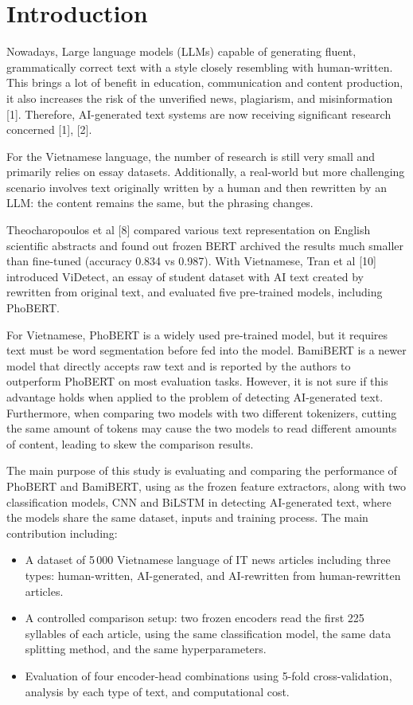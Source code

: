 \documentclass[conference,a4paper]{IEEEtran}
\begin{document}
\section{Introduction}
\label{sec:intro}
Nowadays, Large language models (LLMs) capable of generating fluent, grammatically correct text with a style closely resembling with human-written. This brings a lot of benefit in education, communication and content production, it also increases the risk of the unverified news, plagiarism, and misinformation [1]. Therefore, AI-generated text systems are now receiving significant research concerned [1], [2].

For the Vietnamese language, the number of research is still very small and primarily relies on essay datasets. Additionally, a real-world but more challenging scenario involves text originally written by a human and then rewritten by an LLM: the content remains the same, but the phrasing changes.

Theocharopoulos et al [8] compared various text representation on English scientific abstracts and found out frozen BERT archived the results much smaller than fine-tuned (accuracy 0.834 vs 0.987). With Vietnamese, Tran et al [10] introduced ViDetect, an essay of student dataset with AI text created by rewritten from original text, and evaluated five pre-trained models, including PhoBERT.

For Vietnamese, PhoBERT \cite{phobert} is a widely used  pre-trained model, but it requires text must be word segmentation before fed into the model. BamiBERT \cite{bamibert} is a newer model that directly accepts raw text and is reported by the authors to outperform PhoBERT on most evaluation tasks. However, it is not sure if this advantage holds when applied to the problem of detecting AI-generated text. Furthermore, when comparing two models with two different tokenizers, cutting the same amount of tokens may cause the two models to read different amounts of content, leading to skew the comparison results.

The main purpose of this study is evaluating and comparing the performance of PhoBERT and BamiBERT, using as the frozen feature extractors, along with two classification models, CNN and BiLSTM in detecting AI-generated text, where the models share the same dataset, inputs and training process. The main contribution including:
\begin{itemize}
  \item A dataset of 5\,000 Vietnamese language of IT news articles including three types: human-written, AI-generated, and AI-rewritten from human-rewritten articles.
  \item A controlled comparison setup: two frozen encoders read the first 225 syllables of each article, using the same classification model, the same data splitting method, and the same hyperparameters.
  \item Evaluation of four encoder-head combinations using 5-fold cross-validation, analysis by each type of text, and computational cost.
\end{itemize}
\end{document}
